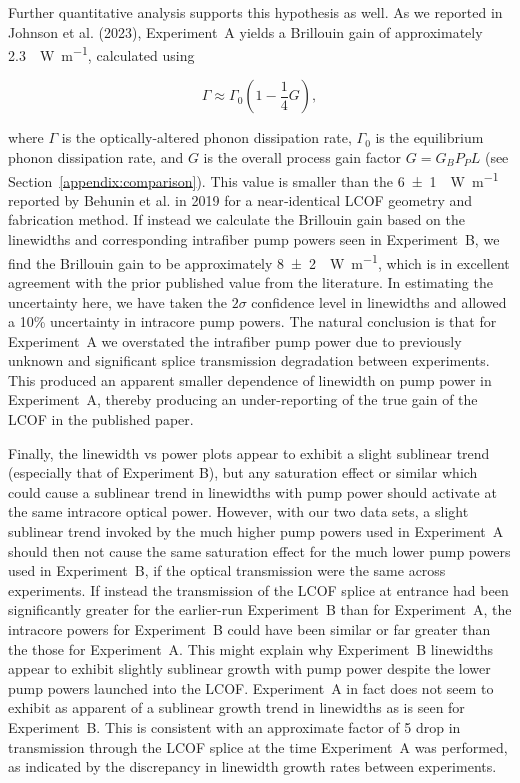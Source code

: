 Further quantitative analysis supports this hypothesis as well. As we reported in Johnson et al. (2023)\cite{johnson2023laser}, Experiment~A yields a Brillouin gain of approximately \SI{2.3}{\per\watt\per\meter}, calculated using\cite{johnson2023laser}

\begin{equation}
  \Gamma \approx \Gamma_{0}\left(1 - \frac{1}{4}G\right),
\end{equation}

where \(\Gamma\) is the optically-altered phonon dissipation rate, \(\Gamma_{0}\) is the equilibrium phonon dissipation rate, and \(G\) is the overall process gain factor \(G = G_{B}P_{P}L\) (see Section~\ref{appendix:comparison}). This value is smaller than the \SI{6(1)}{\per\watt\per\meter} reported by Behunin et al. in 2019\cite{behunin2019spontaneous} for a near‐identical \ac{LCOF} geometry and fabrication method. If instead we calculate the Brillouin gain based on the linewidths and corresponding intrafiber pump powers seen in Experiment~B, we find the Brillouin gain to be approximately \SI{8(2)}{\per\watt\per\meter}, which is in excellent agreement with the prior published value from the literature. In estimating the uncertainty here, we have taken the \(2\sigma\) confidence level in linewidths and allowed a 10\% uncertainty in intracore pump powers. The natural conclusion is that for Experiment~A we overstated the intrafiber pump power due to previously unknown and significant splice transmission degradation between experiments. This produced an apparent smaller dependence of linewidth on pump power in Experiment~A, thereby producing an under-reporting of the true gain of the \ac{LCOF} in the published paper.

Finally, the linewidth vs power plots appear to exhibit a slight sublinear trend (especially that of Experiment B), but any saturation effect or similar which could cause a sublinear trend in linewidths with pump power should activate at the same intracore optical power. However, with our two data sets, a slight sublinear trend invoked by the much higher pump powers used in Experiment~A should then not cause the same saturation effect for the much lower pump powers used in Experiment~B, if the optical transmission were the same across experiments. If instead the transmission of the \ac{LCOF} splice at entrance had been significantly greater for the earlier-run Experiment~B than for Experiment~A, the intracore powers for Experiment~B could have been similar or far greater than the those for Experiment~A. This might explain why Experiment~B linewidths appear to exhibit slightly sublinear growth with pump power despite the lower pump powers launched into the \ac{LCOF}. Experiment~A in fact does not seem to exhibit as apparent of a sublinear growth trend in linewidths as is seen for Experiment~B. This is consistent with an approximate factor of 5 drop in transmission through the \ac{LCOF} splice at the time Experiment~A was performed, as indicated by the discrepancy in linewidth growth rates between experiments.

